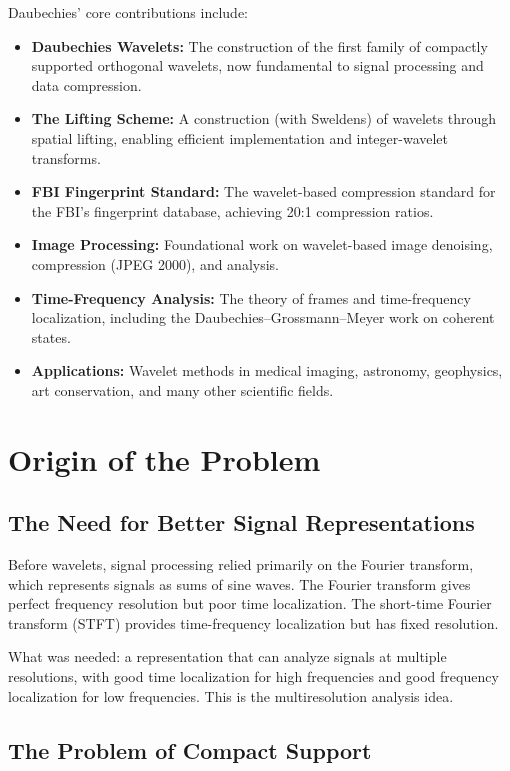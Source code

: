 Daubechies' core contributions include:
\begin{itemize}
    \item \textbf{Daubechies Wavelets:} The construction of the first family of compactly supported orthogonal wavelets, now fundamental to signal processing and data compression.
    \item \textbf{The Lifting Scheme:} A construction (with Sweldens) of wavelets through spatial lifting, enabling efficient implementation and integer-wavelet transforms.
    \item \textbf{FBI Fingerprint Standard:} The wavelet-based compression standard for the FBI's fingerprint database, achieving 20:1 compression ratios.
    \item \textbf{Image Processing:} Foundational work on wavelet-based image denoising, compression (JPEG 2000), and analysis.
    \item \textbf{Time-Frequency Analysis:} The theory of frames and time-frequency localization, including the Daubechies--Grossmann--Meyer work on coherent states.
    \item \textbf{Applications:} Wavelet methods in medical imaging, astronomy, geophysics, art conservation, and many other scientific fields.
\end{itemize}

\section{Origin of the Problem}

\subsection{The Need for Better Signal Representations}

Before wavelets, signal processing relied primarily on the Fourier transform, which represents signals as sums of sine waves. The Fourier transform gives perfect frequency resolution but poor time localization. The short-time Fourier transform (STFT) provides time-frequency localization but has fixed resolution.

What was needed: a representation that can analyze signals at multiple resolutions, with good time localization for high frequencies and good frequency localization for low frequencies. This is the multiresolution analysis idea.

\subsection{The Problem of Compact Support}


